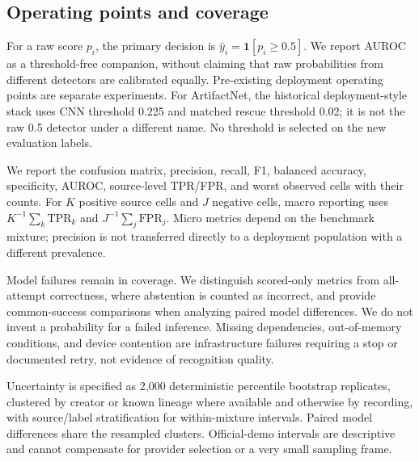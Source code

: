 \documentclass[10pt,a4paper]{article}
\begin{document}
\subsection{Operating points and coverage}
For a raw score $p_i$, the primary decision is $\hat y_i=\mathbf{1}[p_i\geq0.5]$.
We report AUROC as a threshold-free companion, without claiming that raw
probabilities from different detectors are calibrated equally. Pre-existing
deployment operating points are separate experiments. For ArtifactNet, the
historical deployment-style stack uses CNN threshold 0.225 and matched rescue
threshold 0.02; it is not the raw 0.5 detector under a different name.
No threshold is selected on the new evaluation labels.

We report the confusion matrix, precision, recall, F1, balanced accuracy,
specificity, AUROC, source-level TPR/FPR, and worst observed cells with their
counts. For $K$ positive source cells and $J$ negative cells, macro reporting
uses $K^{-1}\sum_k\mathrm{TPR}_k$ and $J^{-1}\sum_j\mathrm{FPR}_j$.
Micro metrics depend on the benchmark mixture; precision is not transferred
directly to a deployment population with a different prevalence.

Model failures remain in coverage. We distinguish scored-only metrics from
all-attempt correctness, where abstention is counted as incorrect, and provide
common-success comparisons when analyzing paired model differences. We do not
invent a probability for a failed inference. Missing dependencies, out-of-memory
conditions, and device contention are infrastructure failures requiring a stop
or documented retry, not evidence of recognition quality.

Uncertainty is specified as 2,000 deterministic percentile bootstrap replicates,
clustered by creator or known lineage where available and otherwise by recording,
with source/label stratification for within-mixture intervals. Paired model
differences share the resampled clusters. Official-demo intervals are descriptive
and cannot compensate for provider selection or a very small sampling frame.
\end{document}
